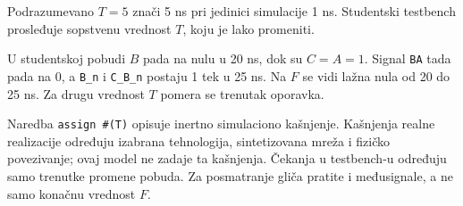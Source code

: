 
Podrazumevano \(T=5\) znači 5 ns pri jedinici simulacije 1 ns. Studentski testbench prosleđuje sopstvenu vrednost \(T\), koju je lako promeniti.

U studentskoj pobudi \(B\) pada na nulu u 20 ns, dok su \(C=A=1\). Signal \texttt{BA} tada pada na 0, a \texttt{B\_n} i \texttt{C\_B\_n} postaju 1 tek u 25 ns. Na \(F\) se vidi lažna nula od 20 do 25 ns. Za drugu vrednost \(T\) pomera se trenutak oporavka.

Naredba \texttt{assign \#(T)} opisuje inertno simulaciono kašnjenje. Kašnjenja realne realizacije određuju izabrana tehnologija, sintetizovana mreža i fizičko povezivanje; ovaj model ne zadaje ta kašnjenja. Čekanja u testbench-u određuju samo trenutke promene pobuda. Za posmatranje gliča pratite i međusignale, a ne samo konačnu vrednost \(F\).
